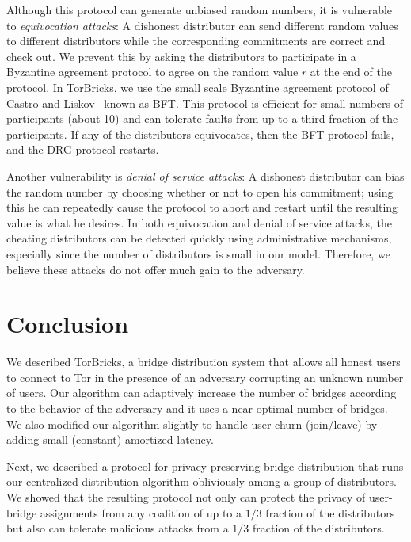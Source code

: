 \documentclass[letterpaper,twocolumn,10pt]{article}
\newcommand{\bricks}{}
\def\bricks/{\mbox{TorBricks}}
\begin{document}
Although this protocol can generate unbiased random numbers, it is vulnerable to \emph{equivocation attacks}:
A dishonest distributor can send different random values to different distributors while the corresponding commitments are correct and check out. We prevent this by asking the distributors to participate in a Byzantine agreement protocol to agree on the random value $r$ at the end of the protocol. In \bricks/, we use the small scale Byzantine agreement protocol of Castro and Liskov~\cite{CL1} known as BFT. This protocol is efficient for small numbers of participants (about 10) and can tolerate faults from up to a third fraction of the participants. If any of the distributors equivocates, then the BFT protocol fails, and the DRG protocol restarts. 

Another vulnerability is \emph{denial of service attacks}: A dishonest distributor can bias the random number by choosing whether or not to open his commitment; using this he can repeatedly cause the protocol to abort and restart until the resulting value is what he desires. In both equivocation and denial of service attacks, the cheating distributors can be detected quickly using administrative mechanisms, especially since the number of distributors is small in our model. Therefore, we believe these attacks do not offer much gain to the adversary.

\section{Conclusion} \label{sec:conclusion}
We described \bricks/, a bridge distribution system that allows all honest users to connect to Tor in the presence of an adversary corrupting an unknown number of users. Our algorithm can adaptively increase the number of bridges according to the behavior of the adversary and it uses a near-optimal number of bridges. We also modified our algorithm slightly to handle user churn (join/leave) by adding small (constant) amortized latency.

Next, we described a protocol for privacy-preserving bridge distribution that runs our centralized distribution algorithm obliviously among a group of distributors. We showed that the resulting protocol not only can protect the privacy of user-bridge assignments from any coalition of up to a $1/3$ fraction of the distributors but also can tolerate malicious attacks from a $1/3$ fraction of the distributors. %
\end{document}
